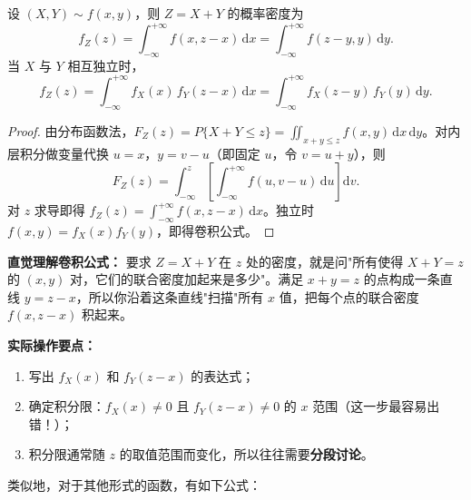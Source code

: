 ﻿\documentclass[lang=cn,11pt]{elegantbook}
\begin{document}
\begin{theorem}[卷积公式] \label{thm:convolution}
设 $(X,Y) \sim f(x,y)$，则 $Z = X + Y$ 的概率密度为
\[
f_Z(z) = \int_{-\infty}^{+\infty}f(x, z-x)\,\mathrm{d}x = \int_{-\infty}^{+\infty}f(z-y, y)\,\mathrm{d}y.
\]
当 $X$ 与 $Y$ 相互独立时，
\[
f_Z(z) = \int_{-\infty}^{+\infty}f_X(x)\,f_Y(z-x)\,\mathrm{d}x = \int_{-\infty}^{+\infty}f_X(z-y)\,f_Y(y)\,\mathrm{d}y.
\]
\end{theorem}
\begin{proof}
由分布函数法，\(F_Z(z) = P\{X+Y \leqslant z\} = \iint_{x+y \leqslant z} f(x,y)\,\mathrm{d}x\,\mathrm{d}y\)。对内层积分做变量代换 \(u = x\)，\(y = v - u\)（即固定 \(u\)，令 \(v = u+y\)），则
\[
F_Z(z) = \int_{-\infty}^{z}\left[\int_{-\infty}^{+\infty} f(u, v-u)\,\mathrm{d}u\right]\mathrm{d}v.
\]
对 \(z\) 求导即得 \(f_Z(z) = \int_{-\infty}^{+\infty} f(x, z-x)\,\mathrm{d}x\)。独立时 \(f(x,y)=f_X(x)f_Y(y)\)，即得卷积公式。
\end{proof}

\begin{note}
\textbf{直觉理解卷积公式：} 要求 $Z=X+Y$ 在 $z$ 处的密度，就是问"所有使得 $X+Y=z$ 的 $(x,y)$ 对，它们的联合密度加起来是多少"。满足 $x+y=z$ 的点构成一条直线 $y=z-x$，所以你沿着这条直线"扫描"所有 $x$ 值，把每个点的联合密度 $f(x,z-x)$ 积起来。

\textbf{实际操作要点：}
\begin{enumerate}
    \item 写出 $f_X(x)$ 和 $f_Y(z-x)$ 的表达式；
    \item 确定积分限：$f_X(x)\neq 0$ 且 $f_Y(z-x)\neq 0$ 的 $x$ 范围（这一步最容易出错！）；
    \item 积分限通常随 $z$ 的取值范围而变化，所以往往需要\textbf{分段讨论}。
\end{enumerate}
\end{note}

类似地，对于其他形式的函数，有如下公式：
\end{document}
